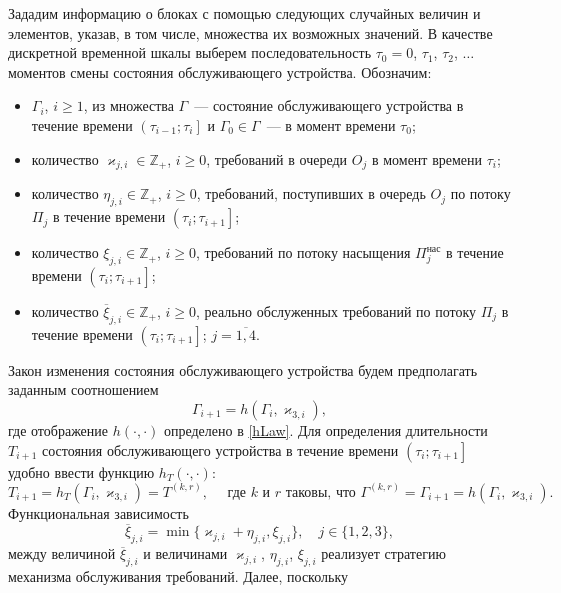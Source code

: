 Зададим информацию о блоках с помощью следующих случайных величин и элементов,  указав,  в том числе,  множества их возможных значений. В качестве дискретной временной шкалы выберем последовательность $\tau_0=0$,  $\tau_1$,  $\tau_2$,  $\ldots$ моментов смены состояния обслуживающего устройства. Обозначим:
\begin{itemize}
\item $\Gamma_i$,  $i\geqslant 1$,  из множества $\Gamma$~--- состояние обслуживающего устройства в течение времени $\left(\tau_{i-1};\tau_i\right]$ и $\Gamma_0\in \Gamma$~--- в момент времени $\tau_0$;
\item количество $\varkappa_{j, i} \in \mathbb{Z}_+ $,  $i\geqslant 0$,  требований в очереди $O_j$ в момент времени $\tau_i$;
\item количество $\eta_{j, i} \in \mathbb{Z}_+$,  $i\geqslant 0$,  требований,  поступивших в очередь $O_j$ по потоку $\Pi_j$ в течение времени $\left(\tau_{i};\tau_{i+1}\right]$;
\item количество $\xi_{j, i} \in \mathbb{Z}_+$,  $i\geqslant 0$,  требований по потоку насыщения $\Pi^{\mathrm{\text{нас}}}_j$ в течение времени $\left(\tau_{i};\tau_{i+1}\right]$;
\item количество $\overline{\xi}_{j, i}\in \mathbb{Z}_+$,  $i\geqslant 0$,  реально обслуженных требований по потоку $\Pi_j$ в течение времени $\left(\tau_{i};\tau_{i+1}\right]$; $j=\overline{1, 4}$.
\end{itemize}
Закон изменения состояния обслуживающего устройства будем предполагать заданным соотношением 
\begin{equation}
\Gamma_{i+1}=h(\Gamma_i,  \varkappa_{3, i}), 
\label{gammaFunc}
\end{equation}
где отображение $h(\cdot,  \cdot)$ определено в \eqref{hLaw}.
Для определения длительности $T_{i+1}$ состояния обслуживающего устройства в течение времени $\left(\tau_{i};\tau_{i+1}\right]$ удобно ввести функцию $h_T(\cdot,  \cdot)$:
\begin{equation*}
T_{i+1}=h_T(\Gamma_i,  \varkappa_{3,  i})= T^{(k,  r)}, \quad  \text{ где $k$ и $r$ таковы,  что } \Gamma^{(k,  r)}=\Gamma_{i+1}=h(\Gamma_i, \varkappa_{3,  i}).
\end{equation*}
Функциональная зависимость
\begin{equation}
\overline{\xi}_{j,  i}=\min\{\varkappa_{j,  i}+\eta_{j,  i},  \xi_{j,  i}\},  \quad j \in \{1,  2,  3\}, 
\label{saturationEq}
\end{equation}
между величиной $\overline{\xi}_{j, i}$ и величинами $\varkappa_{j, i}$,  $\eta_{j, i}$,  $\xi_{j, i}$ реализует стратегию механизма обслуживания требований. Далее,  поскольку 
